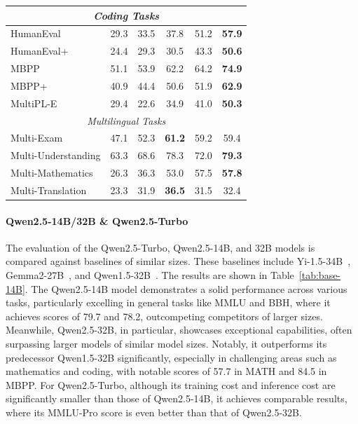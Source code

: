 \begin{table}[tbp]
\begin{tabular}{@{}lccccc@{}}
\midrule
\multicolumn{6}{c}{\textit{Coding Tasks}} \\
\midrule
HumanEval & 29.3 & 33.5 & 37.8 & 51.2 & \textbf{57.9} \\
HumanEval+ & 24.4 & 29.3 & 30.5 & 43.3 & \textbf{50.6} \\
MBPP & 51.1 & 53.9 & 62.2 & 64.2 & \textbf{74.9} \\
MBPP+ & 40.9 & 44.4 & 50.6 & 51.9 & \textbf{62.9} \\
MultiPL-E & 29.4 & 22.6 & 34.9 & 41.0 & \textbf{50.3} \\
\midrule
\multicolumn{6}{c}{\textit{Multilingual Tasks}} \\
\midrule
Multi-Exam & 47.1 & 52.3 & \textbf{61.2} & 59.2 & 59.4 \\
Multi-Understanding & 63.3 & 68.6 & 78.3 & 72.0 & \textbf{79.3} \\
Multi-Mathematics & 26.3 & 36.3 & 53.0 & 57.5 & \textbf{57.8} \\
Multi-Translation & 23.3 & 31.9 & \textbf{36.5} & 31.5 & 32.4 \\
\bottomrule
\end{tabular}
\end{table}

\paragraph{Qwen2.5-14B/32B \& Qwen2.5-Turbo}
The evaluation of the Qwen2.5-Turbo, Qwen2.5-14B, and 32B models is compared against baselines of similar sizes. 
These baselines include Yi-1.5-34B~\citep{yi}, Gemma2-27B~\citep{gemma2}, and Qwen1.5-32B~\citep{qwen1.5}.
The results are shown in Table~\ref{tab:base-14B}.
The Qwen2.5-14B model demonstrates a solid performance across various tasks, particularly excelling in general tasks like MMLU and BBH, where it achieves scores of 79.7 and 78.2, outcompeting competitors of larger sizes. Meanwhile, Qwen2.5-32B, in particular, showcases exceptional capabilities, often surpassing larger models of similar model sizes. Notably, it outperforms its predecessor Qwen1.5-32B significantly, especially in challenging areas such as mathematics and coding, with notable scores of 57.7 in MATH and 84.5 in MBPP. For Qwen2.5-Turbo, although its training cost and inference cost are significantly smaller than those of Qwen2.5-14B, it achieves comparable results, where its MMLU-Pro score is even better than that of Qwen2.5-32B.



